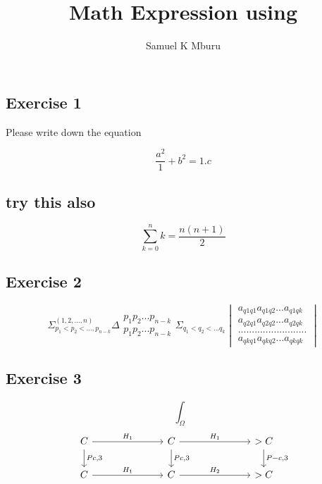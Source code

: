 \documentclass{article}
\title{Math Expression using }
\author{Samuel K Mburu}
\begin{document}
\maketitle


\subsection{Exercise 1}
Please write down the equation 


\[ \frac{a^2}{1}+b^2 = {1}.{c}  \]

\subsection{try this also }

\[ \sum_{k=0}^{n} {k} = \frac{n(n+1)}{2} \]



\subsection{Exercise 2}

\[\Sigma^{(1,2,...,n)}_{p_1<p_2<...,p_{n-k}} \Delta \begin{matrix}p_1p_2...p_{n-k}\\p_1p_2...p_{n-k}\end{matrix}\Sigma_{q_1<q_2<...q_k}\begin{vmatrix}a_{q1q1}a_{q1q2}...a_{q1qk}\\a_{q2q1} a_{q2q2}...a_{q2qk}\\.........................\\a_{qkq1}a_{qkq2}...a_{qkqk}\end{vmatrix}\]

\subsection{Exercise 3}

\[ \int_\Omega\]
\begin{equation*}
\begin{tikzcd}[column sep=6pc]
C_{} \arrow{r}{H_1} \arrow{d}{Pc,3} & 
C_{} \arrow{r}{H_1} \arrow{d}{Pc,3} &
>C_{} \arrow{d}{P-c,3} \\
C \arrow{r}{H_1} &
C{} \arrow{r}{H_2} &
> C{}
\end{tikzcd}
\end{equation*}
\end{document}
